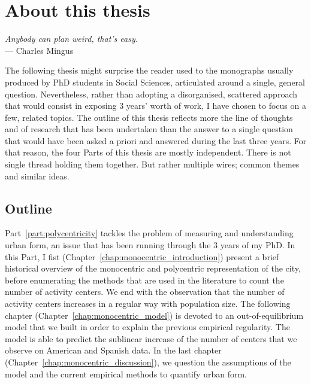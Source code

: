

\chapter{About this thesis}
\label{chap:methodology}


\begin{flushright}{\slshape    
Anybody can plan weird, that's easy.} \\ \medskip
--- Charles Mingus
\end{flushright}


\bigskip 


The following thesis might surprise the reader used to the monographs usually
produced by PhD students in Social Sciences, articulated around a single,
general question. Nevertheless, rather than adopting a disorganised, scattered
approach that would consist in exposing $3$ years' worth of work, I have chosen
to focus on a few, related topics. The outline of this thesis reflects more the
line of thoughts and of research that has been undertaken than the answer to a
single question that would have been asked a priori and answered during the
last three years. For that reason, the four Parts of this thesis are mostly
independent. There is not single thread holding them together. But rather multiple
wires; common themes and similar ideas. 

\section{Outline}

Part~\ref{part:polycentricity} tackles the problem of measuring and
understanding urban form, an issue that has been running through the $3$ years
of my PhD. In this Part, I fist (Chapter~\ref{chap:monocentric_introduction})
present a brief historical overview of the monocentric and polycentric
representation of the city, before enumerating the methods that are used in the
literature to count the number of activity centers. We end with the observation
that the number of activity centers increases in a regular way with population
size. The following chapter (Chapter~\ref{chap:monocentric_model}) is devoted to
an out-of-equilibrium model that we built in order to explain the previous
empirical regularity. The model is able to predict the sublinear increase of the
number of centers that we observe on American and Spanish data. In the last
chapter (Chapter~\ref{chap:monocentric_discussion}), we question the assumptions
of the model and the current empirical methods to quantify urban form.\\


